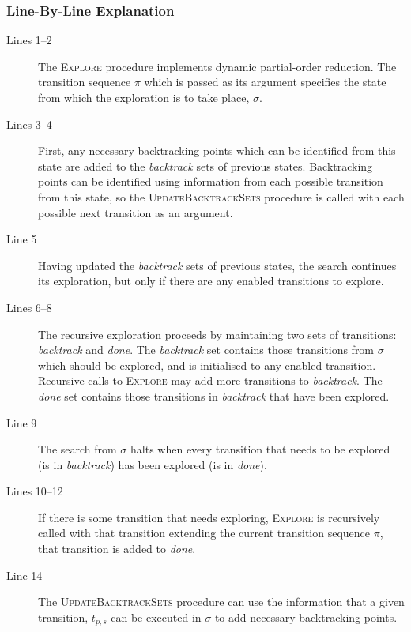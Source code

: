 \documentclass[12pt,a4paper,twoside,openright]{report}
\begin{document}
\subsubsection{Line-By-Line Explanation}
\label{sec:dpor-prep-walkthrough}
\begin{description}
	\item[Lines 1--2] The \textsc{Explore} procedure implements
	dynamic partial-order reduction. The transition sequence
	$\pi$ which is passed as its argument specifies the state
	from which the exploration is to take place, $\sigma$.

	\item[Lines 3--4] First, any necessary backtracking points
	which can be identified from this state are added to the
	\textit{backtrack} sets of previous states. Backtracking
	points can be identified using information from each possible
	transition from this state, so the \textsc{UpdateBacktrackSets}
	procedure is called with each possible next transition as an
	argument.

	\item[Line 5] Having updated the \textit{backtrack} sets
	of previous states, the search continues its exploration,
	but only if there are any enabled transitions to explore.

	\item[Lines 6--8] The recursive exploration proceeds by
	maintaining two sets of transitions: \textit{backtrack}
	and \textit{done}. The \textit{backtrack} set contains
	those transitions from $\sigma$ which should be explored,
	and is initialised to any enabled transition. Recursive calls to
	\textsc{Explore} may add more transitions to \textit{backtrack}.
	The \textit{done} set contains those transitions
	in \textit{backtrack} that have been explored.

	\item[Line 9] The search from $\sigma$ halts when every
	transition that needs to be explored (is in \textit{backtrack})
	has been explored (is in \textit{done}).

	\item[Lines 10--12] If there is some transition that needs
	exploring, \textsc{Explore} is recursively called with that
	transition extending the current transition sequence $\pi$,
	that transition is added to \textit{done}.

	\item[Line 14] The \textsc{UpdateBacktrackSets} procedure
	can use the information that a given transition, $t_{p,s}$ can be
	executed in $\sigma$ to add necessary backtracking points.


\end{description}
\end{document}
